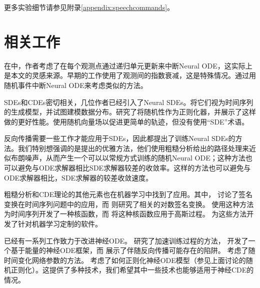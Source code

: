 \documentclass{ctexart}
\theoremstyle{plain}
\theoremstyle{definition}
\begin{document}

更多实验细节请参见附录\ref{appendix:speechcommands}。

\section{相关工作}
在\cite{latent-odes, gru-ode-bayes}中，作者考虑了在每个观测点通过递归单元更新来中断Neural ODE，这实际上是本文的灵感来源。早期的工作\cite{Che2018, BRITS, NeuralHawkes, discreteevent}使用了观测间的指数衰减，这是特殊情况。\cite{njsde}通过用随机事件中断Neural ODE来考虑类似的方法。

SDEs和CDEs密切相关，几位作者已经引入了Neural SDEs。\cite{josef, nsde-generative, stochasticDNF}将它们视为时间序列的生成模型，并试图建模数据分布。\cite{nsde-normalisation, stochasticnode}研究了将随机性作为正则化器，并展示了这样做的更好性能。\cite{stochasticvectorfield}使用随机向量场以促进更简单的轨迹，但没有使用“SDE”术语。

反向传播需要一些工作才能应用于SDEs，因此\cite{scalable-sde, nsde-basic, roughstochasticNF}都提出了训练Neural SDEs的方法。我们特别想强调的是\cite{roughstochasticNF}提出的优雅方法，他们使用粗糙分析给出的路径处理来近似布朗噪声，从而产生一个可以以常规方式训练的随机Neural ODE；这种方法也可以避免与ODE求解器相比SDE求解器较差的收敛率。这样的方法也可以避免与ODE求解器相比，SDE求解器的较差收敛速度。

粗糙分析和CDE理论的其他元素也在机器学习中找到了应用。其中，\cite{kidger2019deep, primer2016, PerezArribas2018different, fermanian2019embedding, morrill2019sepsis, jeremythesis, pathsig, generalisedsignature} 讨论了签名变换在时间序列问题中的应用，而 \cite{logsig-rnn} 则研究了相关的对数签名变换。\cite{kiraly2019kernels} 使用这种方法为时间序列开发了一种核函数，而 \cite{toth2019gp} 将这种核函数应用于高斯过程。\cite{signatory} 为这些方法开发了针对机器学习定制的软件。

已经有一系列工作致力于改进神经ODE。\cite{Quaglino2020SNODE, trainingnode} 研究了加速训练过程的方法，\cite{stable-neural-flows} 开发了一个基于能量的神经ODE框架，而 \cite{anode} 展示了伴随反向传播可能存在的陷阱。\cite{anode2, dissecting} 考虑了随时间变化网络参数的方法。\cite{trainingnode, robust-node} 考虑了如何正则化神经ODE模型（参见上面讨论的随机正则化）。这提供了多种技术，我们希望其中一些技术也能够适用于神经CDE的情况。
\end{document}
